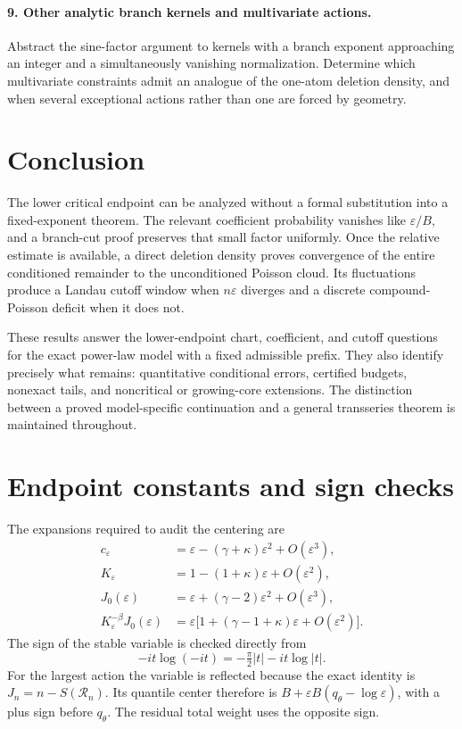 \documentclass[11pt,a4paper]{article}
\theoremstyle{definition}\newtheorem{definition}[theorem]{Definition}
\theoremstyle{remark}\newtheorem{remark}[theorem]{Remark}
\newcommand{\eps}{\varepsilon}
\newcommand{\1}{\mathbf 1}
\begin{document}
\paragraph{9. Other analytic branch kernels and multivariate actions.}
Abstract the sine-factor argument to kernels with a branch exponent
approaching an integer and a simultaneously vanishing normalization.
Determine which multivariate constraints admit an analogue of the
one-atom deletion density, and when several exceptional actions rather
than one are forced by geometry.

\section{Conclusion}

The lower critical endpoint can be analyzed without a formal
substitution into a fixed-exponent theorem. The relevant coefficient
probability vanishes like $\eps/B$, and a branch-cut proof preserves
that small factor uniformly. Once the relative estimate is available,
a direct deletion density proves convergence of the entire conditioned
remainder to the unconditioned Poisson cloud. Its fluctuations produce
a Landau cutoff window when $n\eps$ diverges and a discrete
compound-Poisson deficit when it does not.

These results answer the lower-endpoint chart, coefficient, and cutoff
questions for the exact power-law model with a fixed admissible prefix.
They also identify precisely what remains: quantitative conditional
errors, certified budgets, nonexact tails, and noncritical or growing-core
extensions. The distinction between a proved model-specific continuation
and a general transseries theorem is maintained throughout.

\appendix
\section{Endpoint constants and sign checks}
\label{app:constants}

The expansions required to audit the centering are
\begin{align}
 c_{\eps}&=\eps-(\gamma+\kappa)\eps^2+O(\eps^3),\\
 K_{\eps}&=1-(1+\kappa)\eps+O(\eps^2),\\
 J_0(\eps)&=\eps+(\gamma-2)\eps^2+O(\eps^3),\\
 K_{\eps}^{-\beta}J_0(\eps)
 &=\eps\bigl[1+(\gamma-1+\kappa)\eps+O(\eps^2)\bigr].
\end{align}
The sign of the stable variable is checked directly from
\[
 -it\log(-it)=-\tfrac\pi2|t|-it\log|t|.
\]
For the largest action the variable is reflected because the exact
identity is $J_n=n-S(\mathcal R_n)$. Its quantile center therefore is
$B+\eps B(q_\theta-\log\eps)$, with a plus sign before $q_\theta$.
The residual total weight uses the opposite sign.
\end{document}
